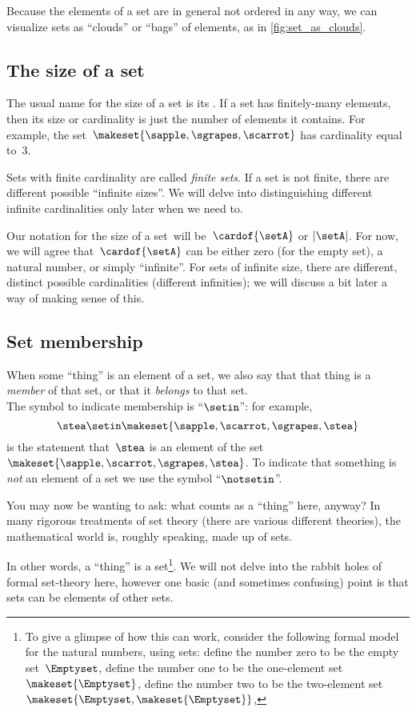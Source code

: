 Because the elements of a set are in general not ordered in any way, we can visualize sets as ``clouds'' or ``bags'' of elements, as in \cref{fig:set_as_clouds}.

\subsection{The size of a set}
\label{sec:cardinality}
The usual name for the size of a set is its .
If a set has finitely-many elements, then its size or cardinality is just the number of elements it contains.
For example, the set~$\makeset{ \sapple, \sgrapes, \scarrot }$ has cardinality equal to~$3$.

Sets with finite cardinality are called \emph{finite sets}.
If a set is not finite, there are different possible ``infinite sizes''.
We will delve into distinguishing different infinite cardinalities only later when we need to.

Our notation for the size of a set~\setA will be~$\cardof{\setA}$ or $\vert \setA \vert$.
For now, we will agree that~$\cardof{\setA}$ can be either zero (for the empty set), a natural number, or simply ``infinite''.
For sets of infinite size, there are different, distinct possible cardinalities (different infinities); we will discuss a bit later a way of making sense of this.

\subsection{Set membership}
\label{sec:set-membership}
When some ``thing'' is an element of a set, we also say that that thing is a \emph{member} of that set, or that it \emph{belongs} to that set.
\\The symbol to indicate membership is ``$\setin$'': for example,
\begin{equation}
    \stea \setin\makeset{ \sapple, \scarrot, \sgrapes, \stea }
\end{equation}
is the statement that~$\stea$ is an element of the set~$\makeset{ \sapple, \scarrot, \sgrapes, \stea }$.
To indicate that something is \emph{not} an element of a set we use the symbol ``$\notsetin$''.

You may now be wanting to ask: what counts as a ``thing'' here, anyway?
In many rigorous treatments of set theory (there are various different theories), the mathematical world is, roughly speaking, made up of sets.

In other words, a ``thing'' is a set\footnote{
    To give a glimpse of how this can work, consider the following formal model for the natural numbers, using sets: define the number zero to be the empty set~$\Emptyset$, define the number one to be the one-element set~$\makeset{ \Emptyset }$, define the number two to be the two-element set~$\makeset{ \Emptyset, \makeset{ \Emptyset } }$, \etc }.
We will not delve into the rabbit holes of formal set-theory here, however one basic (and sometimes confusing) point is that sets can be elements of other sets.

